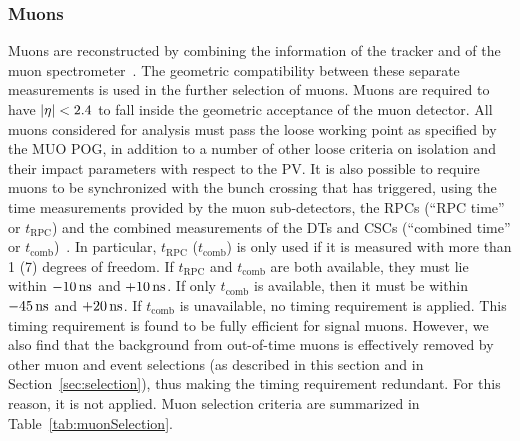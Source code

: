 \subsubsection{Muons}\label{sec:llmuon}
Muons are reconstructed by combining the information of the tracker
and of the muon
spectrometer~\cite{Sirunyan:2018fpa}.
The geometric compatibility between these separate measurements is
used in the further selection of muons. Muons are required to have
$|\eta|<2.4$ to fall inside the geometric acceptance of the muon
detector.
All muons considered for analysis must pass the loose working point as
specified by the MUO POG, in addition to a number
of other loose criteria on isolation and their impact parameters with
respect to the PV.
It is also possible to require muons to be synchronized with the bunch
crossing that has triggered, using the time measurements provided by
the muon sub-detectors, the RPCs (``RPC time'' or $t_{\mathrm{RPC}}$)
and the combined measurements of the DTs and CSCs (``combined time''
or $t_{\mathrm{comb}}$)~\cite{muon_oot}.
In particular, $t_{\mathrm{RPC}}$ ($t_{\mathrm{comb}}$) is only used
if it is measured with more than 1 (7) degrees of freedom.
If $t_{\mathrm{RPC}}$ and $t_{\mathrm{comb}}$ are both available,
they must lie within $-10\mathrm{\,ns}$ and $+10\mathrm{\,ns}$.
If only $t_{\mathrm{comb}}$ is available, then it must be within
$-45\mathrm{\,ns}$ and $+20\mathrm{\,ns}$.
If $t_{\mathrm{comb}}$ is unavailable, no timing requirement is
applied.
This timing requirement is found to be fully efficient for signal
muons. However, we also find that the background from out-of-time
muons is effectively removed by other muon and event selections (as
described in this section and in Section~\ref{sec:selection}), thus
making the timing requirement redundant. For this reason, it is not
applied.  
Muon selection criteria are summarized in
Table~\ref{tab:muonSelection}.

